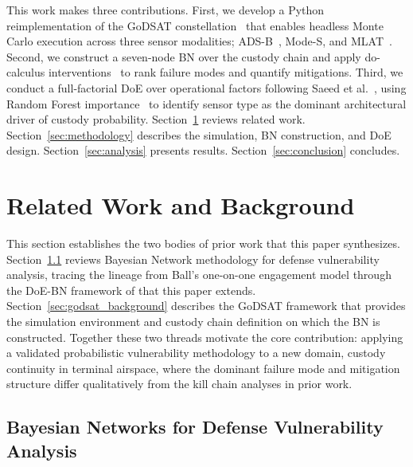 \documentclass[]{spie}
\begin{document}
This work makes three contributions. First, we develop a Python reimplementation of the GoDSAT constellation~\cite{Saeed2026GoDSATRL} that enables headless Monte Carlo execution across three sensor modalities; ADS-B~\cite{adsb_faa}, Mode-S, and MLAT~\cite{opensky}. Second, we construct a seven-node BN over the custody chain and apply do-calculus interventions~\cite{Koller2009} to rank failure modes and quantify mitigations. Third, we conduct a full-factorial DoE over operational factors following Saeed et al.~\cite{Saeed2025DOEFramework}, using Random Forest importance~\cite{Breiman2001} to identify sensor type as the dominant architectural driver of custody probability. Section~\ref{sec:background} reviews related work. Section~\ref{sec:methodology} describes the simulation, BN construction, and DoE design. Section~\ref{sec:analysis} presents results. Section~\ref{sec:conclusion} concludes.

\section{Related Work and Background}
\label{sec:background}

This section establishes the two bodies of prior work that this paper synthesizes. Section~\ref{sec:bn_background} reviews Bayesian Network methodology for defense vulnerability analysis, tracing the lineage from Ball's one-on-one engagement model \cite{Ball2003} through the DoE-BN framework of \cite{Saeed2025DOEFramework,Saeed2025BNDOE} that this paper extends. Section~\ref{sec:godsat_background} describes the GoDSAT framework \cite{Saeed2026GoDSATRL} that provides the simulation environment and custody chain definition on which the BN is constructed. Together these two threads motivate the core 
contribution: applying a validated probabilistic vulnerability methodology to a new domain, custody continuity in terminal airspace, where the dominant failure mode and mitigation structure differ qualitatively from the kill chain analyses in prior work.

\subsection{Bayesian Networks for Defense Vulnerability Analysis}
\label{sec:bn_background}
\end{document}

